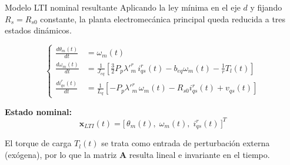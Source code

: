 \documentclass[aspectratio=169,t]{beamer}
\begin{document}
\begin{frame}{Modelo LTI nominal resultante}
{\small\color{uncGray}Aplicando la ley mínima en el eje $d$ y fijando $R_s=R_{s0}$ constante, la planta electromecánica principal queda reducida a tres estados dinámicos.}\par
\vspace{2mm}

\footnotesize
\begin{equation*}
\left\{
\begin{aligned}
\frac{d\theta_m(t)}{dt} &= \omega_m(t) \\[2pt]
\frac{d\omega_m(t)}{dt} &= \frac{1}{J_{eq}}\!\left[\frac{3}{2}P_p\lambda'^r_m\,i_{qs}^r(t)-b_{eq}\omega_m(t)-\frac{1}{r}T_l(t)\right] \\[4pt]
\frac{di_{qs}^r(t)}{dt} &= \frac{1}{L_q}\!\left[-P_p\lambda'^r_m\,\omega_m(t)-R_{s0}i_{qs}^r(t)+v_{qs}(t)\right]
\end{aligned}
\right.
\end{equation*}
\normalsize

\textbf{Estado nominal:}
\begin{equation*}
\bm{x}_{LTI}(t)=\big[\,\theta_m(t),\;\omega_m(t),\;i_{qs}^r(t)\,\big]^T
\end{equation*}

{\small El torque de carga $T_l(t)$ se trata como entrada de perturbación externa (exógena), por lo que la matriz $\bm{A}$ resulta lineal e invariante en el tiempo.}
\end{frame}
\end{document}

